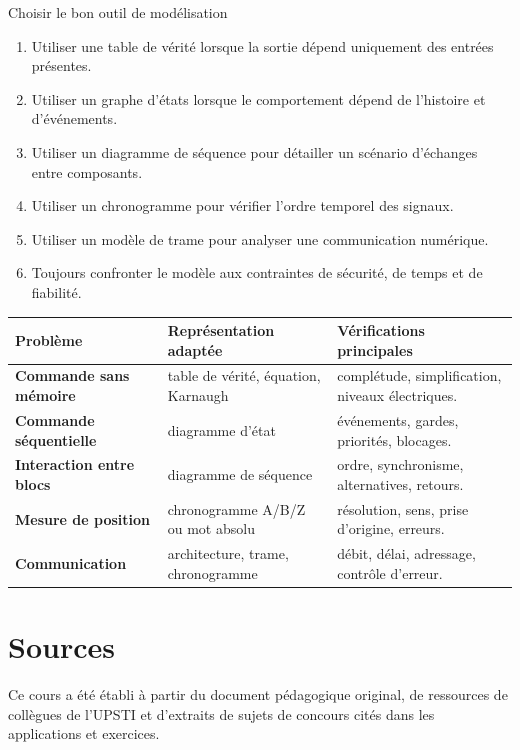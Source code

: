 \begin{TLLogicMethod}{Choisir le bon outil de modélisation}
\begin{enumerate}
  \item Utiliser une table de vérité lorsque la sortie dépend uniquement des entrées présentes.
  \item Utiliser un graphe d'états lorsque le comportement dépend de l'histoire et d'événements.
  \item Utiliser un diagramme de séquence pour détailler un scénario d'échanges entre composants.
  \item Utiliser un chronogramme pour vérifier l'ordre temporel des signaux.
  \item Utiliser un modèle de trame pour analyser une communication numérique.
  \item Toujours confronter le modèle aux contraintes de sécurité, de temps et de fiabilité.
\end{enumerate}
\end{TLLogicMethod}

\begin{center}
\small
\begin{tabularx}{\linewidth}{>{\bfseries}p{3cm}X X}
\toprule
Problème & Représentation adaptée & Vérifications principales \\
\midrule
Commande sans mémoire & table de vérité, équation, Karnaugh & complétude, simplification, niveaux électriques.\\
Commande séquentielle & diagramme d'état & événements, gardes, priorités, blocages.\\
Interaction entre blocs & diagramme de séquence & ordre, synchronisme, alternatives, retours.\\
Mesure de position & chronogramme A/B/Z ou mot absolu & résolution, sens, prise d'origine, erreurs.\\
Communication & architecture, trame, chronogramme & débit, délai, adressage, contrôle d'erreur.\\
\bottomrule
\end{tabularx}
\end{center}

\section{Sources}
\label{sec:logique-sources}

Ce cours a été établi à partir du document pédagogique original, de ressources de collègues de l'UPSTI et d'extraits de sujets de concours cités dans les applications et exercices.
